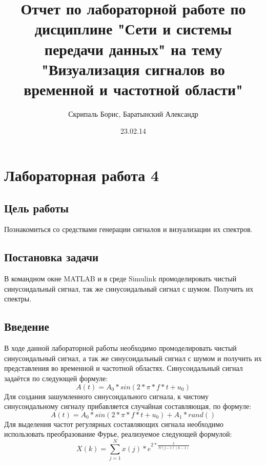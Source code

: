 \documentclass[10pt,a4paper]{report}
\author{Скрипаль Борис, Баратынский Александр}
\title{Отчет по лабораторной работе по дисциплине "Сети и системы передачи данных"\newline
на тему "Визуализация сигналов во временной и частотной области"}
\date{23.02.14}
\begin{document}
\maketitle
\pagebreak
\chapter{Лабораторная работа 4}
\section{Цель работы}
Познакомиться со средствами генерации сигналов и визуализации их спектров.
\section{Постановка задачи}
В командном окне MATLAB и в среде Simulink промоделировать чистый синусоидальный сигнал, 
так же синусоидальный сигнал с шумом. Получить их спектры.
\section{Введение}
В ходе данной лабораторной работы необходимо промоделировать чистый синусоидальный сигнал, а так же синусоидальный сигнал с шумом и получить их представления во временной и частотной областях. Синусоидальный сигнал задаётся по следующей формуле: 
\begin{displaymath}
A(t) = A_0 * sin(2*\pi *f*t + u_0)
\end{displaymath}
Для создания зашумленного синусоидального сигнала, к чистому синусоидальному сигналу прибавляется случайная составляющая, по формуле:
\begin{displaymath}
A(t) = A_0 * sin(2*\pi *f*t + u_0) + A_1*rand()
\end{displaymath}
Для выделения частот регулярных составляющих сигнала необходимо использовать преобразование Фурье, реализуемое следующей формулой:
\begin{displaymath}
X(k) = \sum_{j=1}^N x(j)*e^{2*\frac{x}{N(j-1)(k-1)}}
\end{displaymath}
\end{document}
